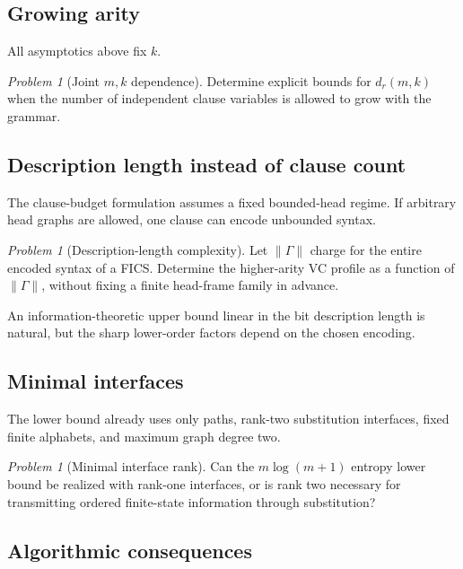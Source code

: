 \documentclass[11pt]{article}
\theoremstyle{definition}
\theoremstyle{remark}
\newtheorem{problem}[theorem]{Problem}
\begin{document}
\subsection{Growing arity}

All asymptotics above fix \(k\).

\begin{problem}[Joint \(m,k\) dependence]
Determine explicit bounds for
\(d_r(m,k)\)
when the number of independent clause variables is allowed to grow with the
grammar.
\end{problem}

\subsection{Description length instead of clause count}

The clause-budget formulation assumes a fixed bounded-head regime. If arbitrary
head graphs are allowed, one clause can encode unbounded syntax.

\begin{problem}[Description-length complexity]
Let \(\|\Gamma\|\) charge for the entire encoded syntax of a FICS. Determine
the higher-arity VC profile as a function of \(\|\Gamma\|\), without fixing a
finite head-frame family in advance.
\end{problem}

An information-theoretic upper bound linear in the bit description length is
natural, but the sharp lower-order factors depend on the chosen encoding.

\subsection{Minimal interfaces}

The lower bound already uses only paths, rank-two substitution interfaces,
fixed finite alphabets, and maximum graph degree two.

\begin{problem}[Minimal interface rank]
Can the \(m\log(m+1)\) entropy lower bound be realized with rank-one interfaces,
or is rank two necessary for transmitting ordered finite-state information
through substitution?
\end{problem}

\subsection{Algorithmic consequences}
\end{document}
